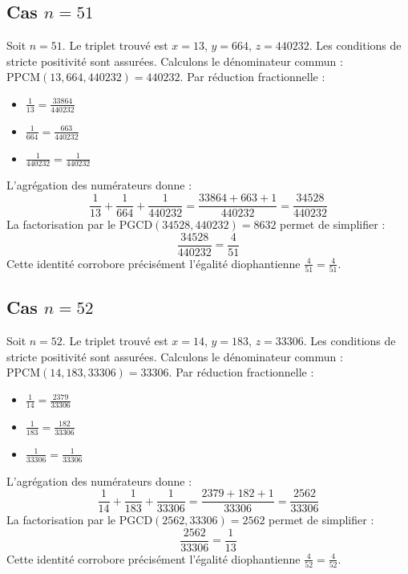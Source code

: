\documentclass[11pt,a4paper]{article}
\begin{document}
\subsection{Cas $n = 51$}
Soit $n = 51$. Le triplet trouvé est $x = 13$, $y = 664$, $z = 440232$.
Les conditions de stricte positivité sont assurées.
Calculons le dénominateur commun : $\text{PPCM}(13, 664, 440232) = 440232$.
Par réduction fractionnelle :
\begin{itemize}
    \item $\frac{1}{13} = \frac{33864}{440232}$
    \item $\frac{1}{664} = \frac{663}{440232}$
    \item $\frac{1}{440232} = \frac{1}{440232}$
\end{itemize}
L'agrégation des numérateurs donne :
$$ \frac{1}{13} + \frac{1}{664} + \frac{1}{440232} = \frac{33864 + 663 + 1}{440232} = \frac{34528}{440232} $$
La factorisation par le $\text{PGCD}(34528, 440232) = 8632$ permet de simplifier :
$$ \frac{34528}{440232} = \frac{4}{51} $$
Cette identité corrobore précisément l'égalité diophantienne $\frac{4}{51} = \frac{4}{51}$.

\subsection{Cas $n = 52$}
Soit $n = 52$. Le triplet trouvé est $x = 14$, $y = 183$, $z = 33306$.
Les conditions de stricte positivité sont assurées.
Calculons le dénominateur commun : $\text{PPCM}(14, 183, 33306) = 33306$.
Par réduction fractionnelle :
\begin{itemize}
    \item $\frac{1}{14} = \frac{2379}{33306}$
    \item $\frac{1}{183} = \frac{182}{33306}$
    \item $\frac{1}{33306} = \frac{1}{33306}$
\end{itemize}
L'agrégation des numérateurs donne :
$$ \frac{1}{14} + \frac{1}{183} + \frac{1}{33306} = \frac{2379 + 182 + 1}{33306} = \frac{2562}{33306} $$
La factorisation par le $\text{PGCD}(2562, 33306) = 2562$ permet de simplifier :
$$ \frac{2562}{33306} = \frac{1}{13} $$
Cette identité corrobore précisément l'égalité diophantienne $\frac{4}{52} = \frac{4}{52}$.
\end{document}
